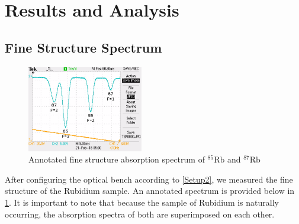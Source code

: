 \documentclass[12pt]{article}
\newcommand{\RbEF}{$^{85}\text{Rb}$ }
\newcommand{\RbES}{$^{87}\text{Rb}$ }
\begin{document}
	
	
	\section{Results and Analysis}
		
	\begin{multicols}{2}
	\subsection{Fine Structure Spectrum}
	
\begin{figure}[H]
	\centering
	\includegraphics[width=0.45\textwidth]{Fine_Structure/AnnotatedSpectrum.jpg}
	\caption{Annotated fine structure absorption spectrum of \RbEF and \RbES}
	\label{RubidiumFineStructure}		
\end{figure}

	\columnbreak
	
	After configuring the optical bench according to \cref{Setup2}, we measured the fine structure of the Rubidium sample. An annotated spectrum is provided below in \cref{RubidiumFineStructure}. It is important to note that because the sample of Rubidium is naturally occurring, the absorption spectra of both are superimposed on each other.
	
	\end{multicols}
	
	
\end{document}

